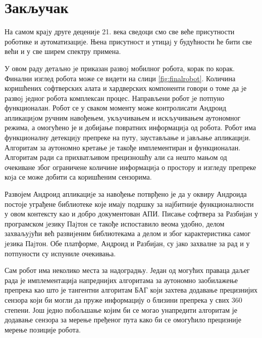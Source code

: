 \documentclass[12pt,oneside]{memoir}
\theoremstyle{remark}
\begin{document}
\chapter{Закључак}
\label{chp:zakljucak}
На самом краjу друге децениjе 21. века сведоци смо све веће присутности роботике и аутоматизациjе. Њена присутност и утицаj у будућности ће бити све већи и у све ширем спектру примена. 

У овом раду детаљно jе приказан развоj мобилног робота, корак по корак. Финални изглед робота може се видети на слици \ref{fig:finalrobot}. Количина коришћених софтверских алата и хардверских компоненти говори о томе да jе развоj jедног робота комплексан процес. Направљени робот jе потпуно функционалан. Робот се у сваком моменту може контролисати Андроид апликациjом ручним навођењем, укључивањем и искључивањем аутономног режима, а омогућено је и добијање повратних информациjа од робота. Робот има функционалну детекциjу препреке на путу, заустављање и jављање апликациjи. Алгоритам за аутономно кретање jе такође имплементиран и функционалан. Алгоритам ради са прихватљивом прецизношћу али са нешто мањом од очекиване због ограничене количине информациjа о простору и изгледу препреке коjа се може добити са коришћеним сензорима.

Развојем Андроид апликациjе за навођење потврђено је да у оквиру Андроида постоје уграђене библиотеке које имају подршку за најбитније функционалности у овом контексту као и добро документован АПИ. Писање софтвера за Разбијан у програмском jезику Паjтон се такође испоставило веома удобно, делом захваљуjући већ развиjеним библиотекама а делом и због карактеристика самог jезика Паjтон. Обе платформе, Андроид и Разбијан, су jако захвалне за рад и у потпуности су испуниле очекивања.

Сам робот има неколико места за надоградњу. Један од могућих праваца даљег рада је имплементација напреднијих алгоритама за аутономно заобилажење препрека као што је тангентни алгоритам БАГ који захтева додавање прецизнијих сензора који би могли да пруже информацију о близини препрека у свих 360 степени. Још једно побољшање којим би се могао унапредити алгоритам је додавање сензора за мерење пређеног пута како би се омогућило прецизније мерење позиције робота.  
\end{document}
